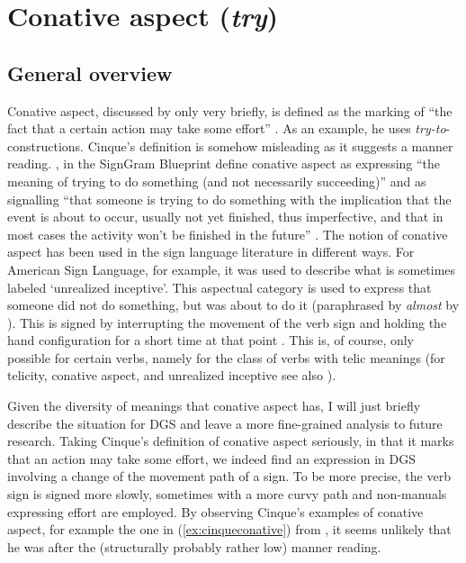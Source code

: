 \section{Conative aspect (\textit{try})}\label{conative}
\subsection{General overview}
Conative aspect, discussed by \citet{cinque1999adverbs, cinque2006restructuring} only very briefly, is defined as the marking of ``the fact that a certain action may take some effort'' \citep[105]{cinque1999adverbs}. As an example, he uses \textit{try-to}-constructions. Cinque's definition is somehow misleading as it suggests a manner reading. \citet[568]{signgram2017}, in the SignGram Blueprint define conative aspect as expressing ``the meaning of trying to do something (and not necessarily succeeding)'' and as signalling ``that someone is trying to do something with the implication that the event is about to occur, usually not yet finished, thus imperfective, and that in most cases the activity won't be finished in the future'' \citep[225--226]{signgram2017}. The notion of conative aspect has been used in the sign language literature in different ways. For American Sign Language, for example, it was used to describe what is sometimes labeled `unrealized inceptive'. This aspectual category is used to express that someone did not do something, but was about to do it (paraphrased by \textit{almost} by \citealt{wilbur2010semantics}). This is signed by interrupting the movement of the verb sign and holding the hand configuration for a short time at that point \citep{liddell1984unrealized, rathmann2005event}. This is, of course, only possible for certain verbs, namely for the class of verbs with telic meanings (for telicity, conative aspect, and unrealized inceptive see also \citealt{wilbur1987american, brentari1998prosodic, wilbur2008complex, wilbur2010semantics}).

Given the diversity of meanings that conative aspect has, I will just briefly describe the situation for DGS and leave a more fine-grained analysis to future research. Taking Cinque's definition of conative aspect seriously, in that it marks that an action may take some effort, we indeed find an expression in DGS involving a change of the movement path of a sign. To be more precise, the verb sign is signed more slowly, sometimes with a more curvy path and non-manuals expressing effort are employed. By observing Cinque's examples of conative aspect, for example the one in (\ref{ex:cinqueconative}) from \citet[143]{cinque2001restructuring}, it seems unlikely that he was after the (structurally probably rather low) manner reading.

